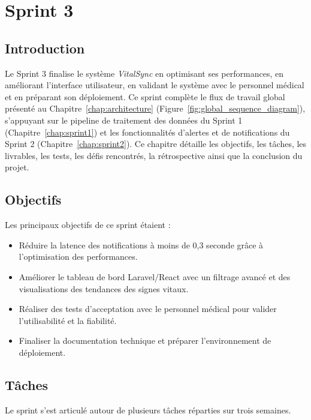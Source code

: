 \chapter{Sprint 3}
\label{chap:sprint3}

\section*{Introduction}
Le Sprint 3 finalise le système \textit{VitalSync} en optimisant ses performances, en améliorant l'interface utilisateur, en validant le système avec le personnel médical et en préparant son déploiement. Ce sprint complète le flux de travail global présenté au Chapitre~\ref{chap:architecture} (Figure~\ref{fig:global_sequence_diagram}), s'appuyant sur le pipeline de traitement des données du Sprint 1 (Chapitre~\ref{chap:sprint1}) et les fonctionnalités d'alertes et de notifications du Sprint 2 (Chapitre~\ref{chap:sprint2}). Ce chapitre détaille les objectifs, les tâches, les livrables, les tests, les défis rencontrés, la rétrospective ainsi que la conclusion du projet.

\section{Objectifs}
Les principaux objectifs de ce sprint étaient :
\begin{itemize}
    \item Réduire la latence des notifications à moins de 0,3 seconde grâce à l'optimisation des performances.
    \item Améliorer le tableau de bord Laravel/React avec un filtrage avancé et des visualisations des tendances des signes vitaux.
    \item Réaliser des tests d'acceptation avec le personnel médical pour valider l'utilisabilité et la fiabilité.
    \item Finaliser la documentation technique et préparer l'environnement de déploiement.
\end{itemize}

\section{Tâches}
Le sprint s'est articulé autour de plusieurs tâches réparties sur trois semaines.

